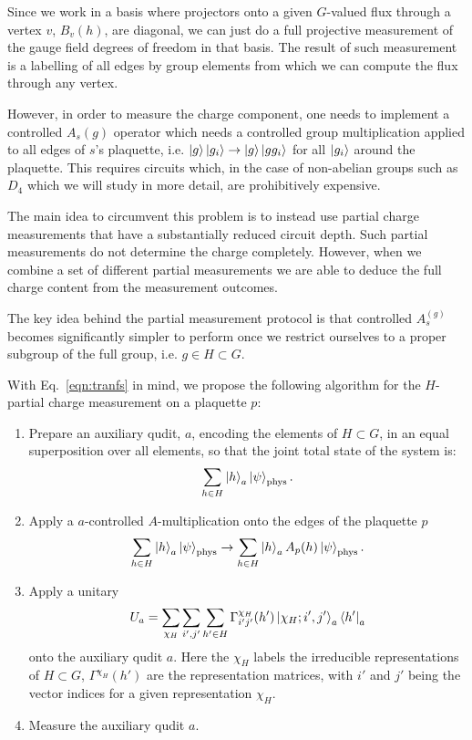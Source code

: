 \documentclass[two column]{article}
\begin{document}
Since we work in a basis where projectors onto a given $G$-valued flux through a vertex $v$, $B_v{(h)}$, are diagonal, we can just do a full projective measurement of the gauge field degrees of freedom in that basis. 
The result of such measurement is a labelling of all edges by group elements from which we can compute the flux through any vertex. 

However, in order to measure the charge component, one needs to implement a controlled $A_s{(g)}$ operator which needs a controlled group multiplication applied to all edges of $s$'s plaquette, i.e. $\ket{g}\ket{g_i} \rightarrow \ket{g}\ket{gg_i}$ for all $\ket{g_i}$ around the plaquette.
This requires circuits which, in the case of non-abelian groups such as $D_4$ which we will study in more detail, are prohibitively expensive. 

The main idea to circumvent this problem is to instead use partial charge measurements that have a substantially reduced circuit depth. Such partial measurements do not determine the charge completely. However, when we combine a set of different partial measurements we are able to deduce the full charge content from the measurement outcomes.

The key idea behind the partial measurement protocol is that controlled $A_s^{(g)}$ becomes significantly simpler to perform once we restrict ourselves to a proper subgroup of the full group, i.e. $g \in H \subset G$.

With Eq.~\eqref{eqn:tranfs} in mind, we propose the following algorithm for the $H$-partial charge measurement on a plaquette $p$:\begin{enumerate}
    \item Prepare an auxiliary qudit, $a$, encoding the elements of $H\subset G$, in an equal superposition over all elements, so that the joint total state of the system is: $$ \sum_{h \in H} \ket{h}_a\ket{\psi}_\text{phys}. $$
    \item Apply a $a$-controlled $A$-multiplication onto the edges of the plaquette $p$$$ \sum_{h \in H} \ket{h}_a\ket{\psi}_\text{phys} \rightarrow \sum_{h \in H} \ket{h}_a A_p{(h)} \ket{\psi}_\text{phys}. $$
    \item Apply a unitary $$ U_a = \sum_{\chi_H}\sum_{i', j'}\sum_{h'\in H}  \Gamma^{\chi_H}_{i'j'}(h')  \ket{\chi_H; i', j'}_a\bra{h'}_a $$ onto the auxiliary qudit $a$. Here the $\chi_H$ labels the irreducible representations of $H \subset G$, $\Gamma^{\chi_H}(h')$ are the representation matrices, with $i'$ and $j'$ being the vector indices for a given representation $\chi_H$.
    \item Measure the auxiliary qudit $a$.
\end{enumerate}
\end{document}

